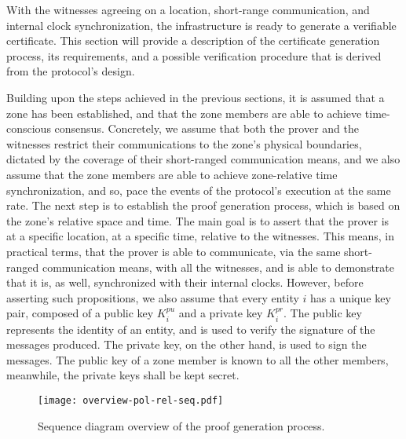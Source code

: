 With the witnesses agreeing on a location, short-range communication, and internal clock synchronization, the infrastructure is ready to generate a verifiable \pol{} certificate. This section will provide a description of the certificate generation process, its requirements, and a possible verification procedure that is derived from the protocol's design. 


Building upon the steps achieved in the previous sections, it is assumed that a zone has been established, and that the zone members are able to achieve time-conscious consensus. Concretely, we assume that both the prover and the witnesses restrict their communications to the zone's physical boundaries, dictated by the coverage of their short-ranged communication means, and we also assume that the zone members are able to achieve zone-relative time synchronization, and so, pace the events of the protocol's execution at the same rate. The next step is to establish the proof generation process, which is based on the zone's relative space and time. The main goal is to assert that the prover is at a specific location, at a specific time, relative to the witnesses. This means, in practical terms, that the prover is able to communicate, via the same short-ranged communication means, with all the witnesses, and is able to demonstrate that it is, as well, synchronized with their internal clocks. However, before asserting such propositions, we also assume that every entity $i$ has a unique key pair, composed of a public key $K^{pu}_i$ and a private key $K^{pr}_i$. The public key represents the identity of an entity, and is used to verify the signature of the messages produced. The private key, on the other hand, is used to sign the messages. The public key of a zone member is known to all the other members, meanwhile, the private keys shall be kept secret. 

\begin{figure}[hb!]
    \begin{center}
    \texttt{[image: overview-pol-rel-seq.pdf]}
    \caption{Sequence diagram overview of the proof generation process.}
    \label{fig:proof-of-location-overview-relative-pol-seq}
    \end{center}
\end{figure}


